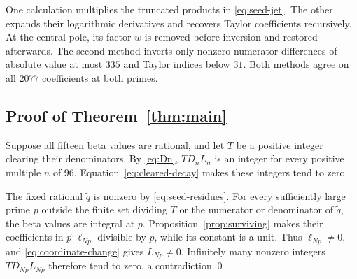 One calculation multiplies the truncated products in
\eqref{eq:seed-jet}. The other expands their logarithmic derivatives
and recovers Taylor coefficients recursively. At the central pole,
its factor $w$ is removed before inversion and restored afterwards.
The second method inverts only nonzero numerator differences of
absolute value at most $335$ and Taylor indices below $31$.
Both methods agree on all $2077$ coefficients at both primes.

\subsection{Proof of Theorem~\ref{thm:main}}
Suppose all fifteen beta values are rational, and let $T$ be a
positive integer clearing their denominators. By \eqref{eq:Dn},
$TD_nL_n$ is an integer for every positive multiple $n$ of $96$.
Equation~\eqref{eq:cleared-decay} makes these integers tend to zero.

The fixed rational $\widetilde q$ is nonzero by
\eqref{eq:seed-residues}. For every sufficiently large prime $p$
outside the finite set dividing $T$ or the numerator or denominator
of $\widetilde q$, the beta values are integral at $p$.
Proposition~\ref{prop:surviving} makes their coefficients in
$p^\tau\ell_{Np}$ divisible by $p$, while its constant is a unit.
Thus $\ell_{Np}\ne0$, and \eqref{eq:coordinate-change} gives
$L_{Np}\ne0$. Infinitely many nonzero integers $TD_{Np}L_{Np}$
therefore tend to zero, a contradiction.\qed
